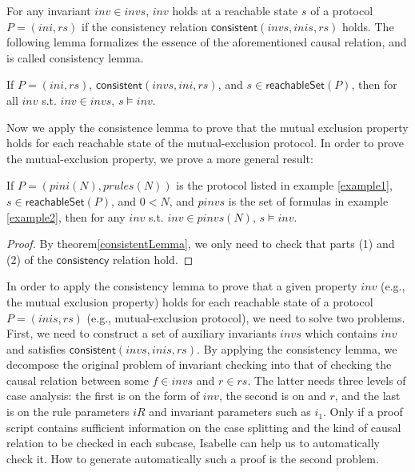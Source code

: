 \documentclass[final]{IEEEtran}
\newcommand\cai[1]{\textcolor{blue}{ #1} }
\begin{document}



For any invariant $inv \in invs$, $inv$ holds at a reachable state $s$  of a protocol $P=(ini,rs)$  if the consistency relation
$\mathsf{consistent}( invs, inis, rs)$ holds. %
The following lemma formalizes the essence of the aforementioned causal relation, and is called consistency lemma.

\begin{theorem}\label{consistentLemma}%
 If $P=(ini,rs)$, $\mathsf{consistent}( invs, ini, rs)$, and $s  \in \mathsf{reachableSet}(P)$, %
 then   for all $inv$ s.t. $inv \in invs$, $s \models inv $.
\end{theorem}



Now we apply the consistence lemma to prove that the mutual exclusion property holds for each reachable state of the mutual-exclusion protocol. %
In order to prove the mutual-exclusion property, we prove a more general result:
\begin{lemma} \label{caseSimp}
  If $ P=(pini(N),prules(N))$ is the protocol listed in example \ref{example1},  $s \in \mathsf{reachableSet}(P)$, and $0<N$, and $pinvs$ is the set of formulas in example \ref{example2},   then for any $inv$ s.t. $inv \in pinvs(N)$, $s\models inv $.
\end{lemma}

\begin{proof} By theorem\ref{consistentLemma}, we only need
to check that parts (1) and (2) of
 the $\mathsf{consistency}$ relation  hold.
 \end{proof}

In order to  apply the consistency lemma to prove that a given property $inv$ (e.g., the mutual exclusion property) holds for each reachable state of a protocol $P=(inis,rs)$ (e.g., mutual-exclusion protocol), we need to solve two problems. First, we need to construct a set of auxiliary invariants $invs$ which contains $inv$ and satisfies  $\mathsf{consistent}( invs, inis, rs)$.  By applying the consistency lemma, we  decompose the original problem of invariant checking into that of checking the causal relation between some $f\in invs$ and $r \in rs$. The latter needs three levels of case analysis: the first is on the form of $inv$, the second is on  and $r$, and the last is on the rule parameters $iR$ and invariant parameters such as $i_1$.  Only if a proof script contains sufficient information on the case splitting and  the kind of causal relation to be checked in each subcase, Isabelle can help us to automatically  check it. How to  generate automatically such a proof is the second problem.
\end{document}
